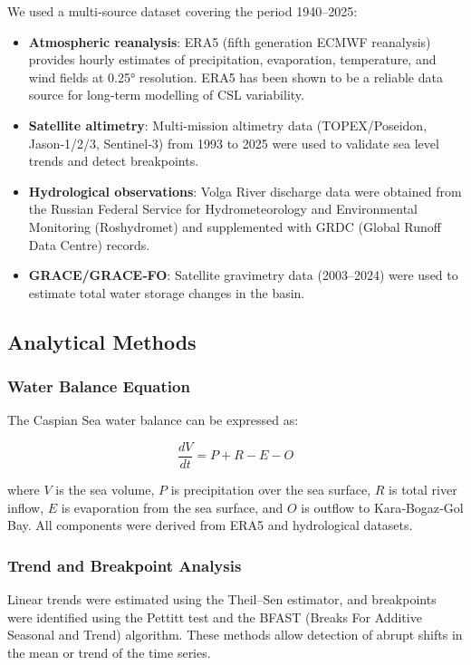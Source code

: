 \documentclass[12pt,a4paper]{article}
\begin{document}
We used a multi‑source dataset covering the period 1940–2025:

\begin{itemize}
    \item \textbf{Atmospheric reanalysis}: ERA5 (fifth generation ECMWF reanalysis) provides hourly estimates of precipitation, evaporation, temperature, and wind fields at 0.25° resolution. ERA5 has been shown to be a reliable data source for long‑term modelling of CSL variability.
    \item \textbf{Satellite altimetry}: Multi‑mission altimetry data (TOPEX/Poseidon, Jason‑1/2/3, Sentinel‑3) from 1993 to 2025 were used to validate sea level trends and detect breakpoints.
    \item \textbf{Hydrological observations}: Volga River discharge data were obtained from the Russian Federal Service for Hydrometeorology and Environmental Monitoring (Roshydromet) and supplemented with GRDC (Global Runoff Data Centre) records.
    \item \textbf{GRACE/GRACE‑FO}: Satellite gravimetry data (2003–2024) were used to estimate total water storage changes in the basin.
\end{itemize}

\subsection{Analytical Methods}

\subsubsection{Water Balance Equation}

The Caspian Sea water balance can be expressed as:

\begin{equation}
    \frac{dV}{dt} = P + R - E - O
\end{equation}

where \(V\) is the sea volume, \(P\) is precipitation over the sea surface, \(R\) is total river inflow, \(E\) is evaporation from the sea surface, and \(O\) is outflow to Kara‑Bogaz‑Gol Bay. All components were derived from ERA5 and hydrological datasets.

\subsubsection{Trend and Breakpoint Analysis}

Linear trends were estimated using the Theil–Sen estimator, and breakpoints were identified using the Pettitt test and the BFAST (Breaks For Additive Seasonal and Trend) algorithm. These methods allow detection of abrupt shifts in the mean or trend of the time series.
\end{document}
